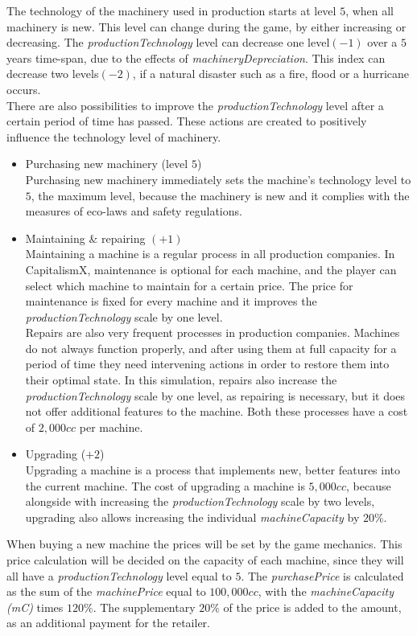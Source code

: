 The technology of the machinery used in production starts at level $5$, when all machinery is new. This level can change during the game, by either increasing or decreasing. The \textit{productionTechnology} level can decrease one level$(-1)$ over a $5$ years time-span, due to the effects of \textit{machineryDepreciation}. This index can decrease two levels$(-2)$, if a natural disaster such as a fire, flood or a hurricane occurs.\\
There are also possibilities to improve the \textit{productionTechnology} level after a certain period of time has passed. These actions are created to  positively influence the technology level of machinery.
\begin{itemize}
    \item Purchasing new machinery (level $5$) \\
Purchasing new machinery immediately sets the machine's technology level to $5$, the maximum level, because the machinery is new and it complies with the measures of eco-laws and safety regulations.
\item Maintaining \& repairing $(+1)$ \\
Maintaining a machine is a regular process in all production companies. In CapitalismX, maintenance is optional for each machine, and the player can select which machine to maintain for a certain price. The price for maintenance is fixed for every machine and it improves the \textit{productionTechnology} scale by one level. \\
Repairs are also very frequent processes in production companies. Machines do not always function properly, and after using them at full capacity for a period of time they need intervening actions in order to restore them into their optimal state. In this simulation, repairs also increase the \textit{productionTechnology} scale by one level, as repairing is necessary, but it does not offer additional features to the machine. Both these processes have a cost of $2,000cc$ per machine.

\item Upgrading ($+2$) \\
Upgrading a machine is a process that implements new, better features into the current machine.
The cost of upgrading a machine is $5,000cc$, because alongside with increasing the \textit{productionTechnology} scale by two levels, upgrading also allows increasing the individual \textit{machineCapacity} by $20\%$. 
\end{itemize}
When buying a new machine the prices will be set by the game mechanics. This price calculation will be decided on the capacity of each machine, since they will all have a \textit{productionTechnology} level equal to $5$. The \textit{purchasePrice} is calculated as the sum of the \textit{machinePrice} equal to $100,000cc$, with the \textit{machineCapacity (\gls{mC})} times $120\%$.  The supplementary $20\%$ of the price is added to the amount, as an additional payment for the retailer.
